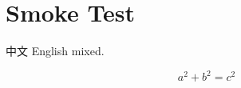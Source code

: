 \documentclass[UTF8,zihao=-4,a4paper,fontset=none]{ctexart}
\begin{document}
\section{Smoke Test}

中文 English  mixed.

\[
  a^2 + b^2 = c^2
\]
\end{document}
